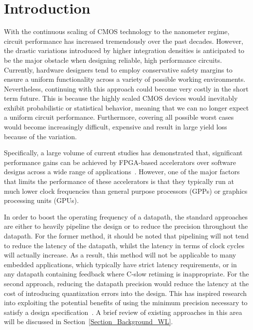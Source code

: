 \documentclass[prodmode,acmtrets]{acmsmall} %
\begin{document}
\maketitle


\section{Introduction}
With the continuous scaling of CMOS technology to the nanometer regime, circuit performance has increased tremendously over the past decades. However, the drastic variations introduced by higher integration densities is anticipated to be the major obstacle when designing reliable, high performance circuits. Currently, hardware designers tend to employ conservative safety margins to ensure a uniform functionality across a variety of possible working environments. Nevertheless, continuing with this approach could become very costly in the short term future. This is because the highly scaled CMOS devices would inevitably exhibit probabilistic or statistical behavior, meaning that we can no longer expect a uniform circuit performance. Furthermore, covering all possible worst cases would become increasingly difficult, expensive and result in large yield loss because of the variation.

Specifically, a large volume of current studies has demonstrated that, significant performance gains can be achieved by FPGA-based accelerators over software designs across a wide range of applications~\cite{UnderwoodFPGAvsCPU,David_MINRES}. However, one of the major factors that limits the performance of these accelerators is that they typically run at much lower clock frequencies than general purpose processors (GPPs) or graphics processing units (GPUs).

In order to boost the operating frequency of a datapath, the standard approaches are either to heavily pipeline the design or to reduce the precision throughout the datapath. For the former method, it should be noted that pipelining will not tend to reduce the latency of the datapath, whilst the latency in terms of clock cycles will actually increase. As a result, this method will not be applicable to many embedded applications, which typically have strict latency requirements, or in any datapath containing feedback where C-slow retiming is inappropriate. For the second approach, reducing the datapath precision would reduce the latency at the cost of introducing quantization errors into the design. This has inspired research into exploiting the potential benefits of using the minimum precision necessary to satisfy a design specification~\cite{GeorgeDT11}. A brief review of existing approaches in this area will be discussed in Section~\ref{Section_Background_WL}.
\end{document}
